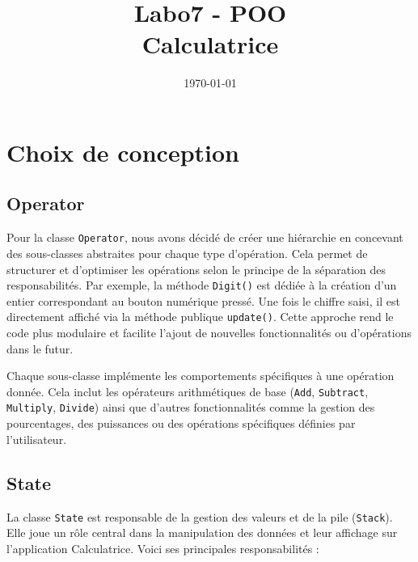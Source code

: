 \documentclass[12pt, a4paper, onecolumn]{article}
\title{Labo7 - POO \\ Calculatrice}
\author{
	\authorstyle{Dani Tiago \largename{Faria dos Santos}\\ Antoine \largename{Aubry } \\ \\ Groupe  \textbf{L02GrP}\\ HEIG-VD} %
}
\date{\today}
\begin{document}
	\twocolumn[ 
	\maketitle
	]
	
	\onecolumn 
	
	\tableofcontents
	\newpage
	
	
	\section{Choix de conception}
\subsection{Operator}

\begin{flushleft}
	Pour la classe \texttt{Operator}, nous avons décidé de créer une hiérarchie en concevant des sous-classes abstraites pour chaque type d'opération. Cela permet de structurer et d'optimiser les opérations selon le principe de la séparation des responsabilités. Par exemple, la méthode \texttt{Digit()} est dédiée à la création d'un entier correspondant au bouton numérique pressé. Une fois le chiffre saisi, il est directement affiché via la méthode publique \texttt{update()}. Cette approche rend le code plus modulaire et facilite l'ajout de nouvelles fonctionnalités ou d'opérations dans le futur.
\linebreak

Chaque sous-classe implémente les comportements spécifiques à une opération donnée. Cela inclut les opérateurs arithmétiques de base (\texttt{Add}, \texttt{Subtract}, \texttt{Multiply}, \texttt{Divide}) ainsi que d'autres fonctionnalités comme la gestion des pourcentages, des puissances ou des opérations spécifiques définies par l'utilisateur.
\end{flushleft}

\subsection{State}

\begin{flushleft}
	La classe \texttt{State} est responsable de la gestion des valeurs et de la pile (\texttt{Stack}). Elle joue un rôle central dans la manipulation des données et leur affichage sur l'application Calculatrice. Voici ses principales responsabilités :
\end{flushleft}
\end{document}
